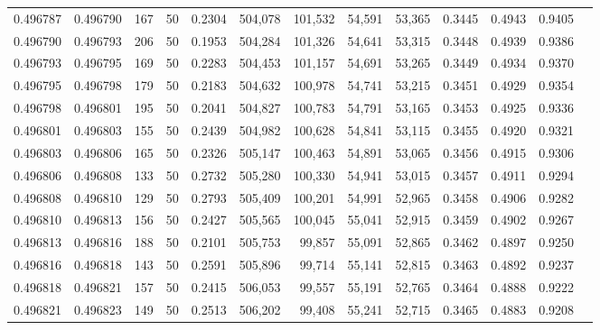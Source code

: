 \begin{tabular}{rrrrrrrrrrrrr}
0.496787 & 0.496790 &   167 &  50 &                                     0.2304 & 504,078 & 101,532 &  54,591 &  53,365 & 0.3445 & 0.4943 & 0.9405 \\
0.496790 & 0.496793 &   206 &  50 &                                     0.1953 & 504,284 & 101,326 &  54,641 &  53,315 & 0.3448 & 0.4939 & 0.9386 \\
0.496793 & 0.496795 &   169 &  50 &                                     0.2283 & 504,453 & 101,157 &  54,691 &  53,265 & 0.3449 & 0.4934 & 0.9370 \\
0.496795 & 0.496798 &   179 &  50 &                                     0.2183 & 504,632 & 100,978 &  54,741 &  53,215 & 0.3451 & 0.4929 & 0.9354 \\
0.496798 & 0.496801 &   195 &  50 &                                     0.2041 & 504,827 & 100,783 &  54,791 &  53,165 & 0.3453 & 0.4925 & 0.9336 \\
0.496801 & 0.496803 &   155 &  50 &                                     0.2439 & 504,982 & 100,628 &  54,841 &  53,115 & 0.3455 & 0.4920 & 0.9321 \\
0.496803 & 0.496806 &   165 &  50 &                                     0.2326 & 505,147 & 100,463 &  54,891 &  53,065 & 0.3456 & 0.4915 & 0.9306 \\
0.496806 & 0.496808 &   133 &  50 &                                     0.2732 & 505,280 & 100,330 &  54,941 &  53,015 & 0.3457 & 0.4911 & 0.9294 \\
0.496808 & 0.496810 &   129 &  50 &                                     0.2793 & 505,409 & 100,201 &  54,991 &  52,965 & 0.3458 & 0.4906 & 0.9282 \\
0.496810 & 0.496813 &   156 &  50 &                                     0.2427 & 505,565 & 100,045 &  55,041 &  52,915 & 0.3459 & 0.4902 & 0.9267 \\
0.496813 & 0.496816 &   188 &  50 &                                     0.2101 & 505,753 &  99,857 &  55,091 &  52,865 & 0.3462 & 0.4897 & 0.9250 \\
0.496816 & 0.496818 &   143 &  50 &                                     0.2591 & 505,896 &  99,714 &  55,141 &  52,815 & 0.3463 & 0.4892 & 0.9237 \\
0.496818 & 0.496821 &   157 &  50 &                                     0.2415 & 506,053 &  99,557 &  55,191 &  52,765 & 0.3464 & 0.4888 & 0.9222 \\
0.496821 & 0.496823 &   149 &  50 &                                     0.2513 & 506,202 &  99,408 &  55,241 &  52,715 & 0.3465 & 0.4883 & 0.9208 \\

\end{tabular}
